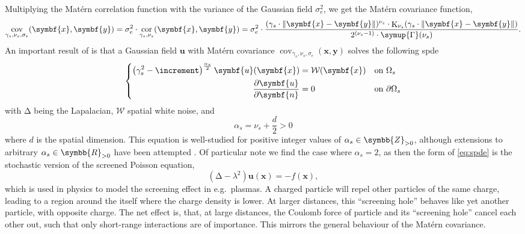 \documentclass[british]{scrreprt}
\renewcommand{\laplacian}{\increment}
\DeclareMathOperator{\cov}{cov}
\DeclareMathOperator{\cor}{cor}
\DeclareMathOperator{\BesselK}{K}
\begin{document}
Multiplying the Matérn correlation function with the variance of the Gaussian field \( \sigma_{e}^{2} \), we get the Matérn covariance function, 
\begin{equation}
    \cov_{\gamma_{s}, \nu_{s}, \sigma_{e}}(\symbf{x}, \symbf{y}) = \sigma_{e}^{2} \cdot \cor_{\gamma_{s}, \nu_{s}}(\symbf{x}, \symbf{y}) = \sigma_{e}^{2} \cdot \frac{(\gamma_{s} \cdot \norm{\symbf{x} - \symbf{y}})^{\nu_{s}} \cdot \BesselK_{\nu_{s}}(\gamma_{s} \cdot \norm{\symbf{x} - \symbf{y}})}{2^{(\nu_{s} - 1)} \cdot \symup{\Gamma}(\nu_{s})}
    \label{eq:matern-cov}
    \text{.}
\end{equation}
An important result of \cite{Whittlestationaryprocessesplane1954} is that a Gaussian field \( \symbf{u} \) with Matérn covariance \( \cov_{\gamma_{s}, \nu_{s}, \sigma_{e}}(\symbf{x}, \symbf{y}) \) solves the following \gls{spde}
\begin{equation}
    \left\{
    \begin{aligned}
        \left( \gamma_{s}^{2} - \laplacian \right)^{\frac{\alpha_{s}}{2}} \symbf{u}(\symbf{x}) &= \mathcal{W}(\symbf{x}) & \text{on } & \Omega_{s} \\
        \pdv{\symbf{u}}{\symbf{n}} &= 0 & \text{on } &\partial\Omega_{s}
    \end{aligned}
    \right.
    \label{eq:spde}
\end{equation}
with \( \laplacian \) being the Lapalacian, \( \mathcal{W} \) spatial white noise, and
\begin{equation}
    \alpha_{s} = \nu_{s} + \frac{d}{2} > 0
    \label{eq:alpha-s}
\end{equation}
where \( d \) is the spatial dimension. This equation is well-studied for positive integer values of \( \alpha_{s} \in \symbb{Z}_{> 0} \), although extensions to arbitrary \( \alpha_{s} \in \symbb{R}_{> 0} \) have been attempted \cite{LindgrenexplicitlinkGaussian2011}. Of particular note we find the case where \( \alpha_{s} = 2 \), as then the form of \cref{eq:spde} is the stochastic version of the screened Poisson equation,
\begin{equation}
    (\laplacian - \lambda^{2}) \symbf{u}(\symbf{x}) = -f(\symbf{x}),
    \label{eq:screened-poisson}
\end{equation}
which is used in physics to model the screening effect in e.g.\ plasmas. A charged particle will repel other particles of the same charge, leading to a region around the itself where the charge density is lower. At larger distances, this \enquote{screening hole} behaves like yet another particle, with opposite charge. The net effect is, that, at large distances, the Coulomb force of particle and its \enquote{screening hole} cancel each other out, such that only short-range interactions are of importance. This mirrors the general behaviour of the Matérn covariance.
\end{document}
